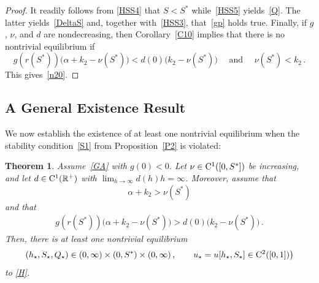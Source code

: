 \documentclass[reqno,11pt]{amsart}
\newtheorem{thm}{Theorem}[section]
\numberwithin{equation}{section}
\newcommand{\R}{\mathbb{R}}
\begin{document}
\begin{proof}
It readily follows from \eqref{HSS4} that $S<S^*$ while~\eqref{HSS5} yields~\eqref{Q}. The latter yields~\eqref{DeltaS}  and, together with~\eqref{HSS3}, that~\eqref{gp} holds true. Finally, if $g$, $\nu$, and $d$ are nondecreasing, then Corollary~\ref{C10} implies that there is no nontrivial equilibrium if 
$$
g(r(S^*))\big(\alpha+k_2-\nu(S^*)\big)< d(0)\big(k_2 -\nu(S^*)\big) \quad \text{ and }\quad \nu(S^*)< k_2\,.
$$
This gives~\eqref{n20}.
\end{proof}

\subsection{A General Existence Result}

We now establish the existence of at least one nontrivial equilibrium when the stability condition~\eqref{S1} from Proposition~\ref{P2} is violated:

\begin{thm}\label{P5}
Assume~\eqref{GA} with  $g(0)<0$. Let $\nu\in {\rm C}^1([0,S^*])$ be increasing, and let $d\in {\rm C}^1(\R^+)$ with $\lim_{h\to\infty} d(h)h=\infty$. Moreover, assume that
\begin{equation}\label{n1}
\alpha+k_2> \nu(S^*)
\end{equation}
and that
\begin{align}\label{n2}
g(r(S^*))\big(\alpha+k_2-\nu(S^*)\big)> d(0)\big(k_2 -\nu(S^*)\big)\,.
\end{align}
Then, there is at least one nontrivial equilibrium 
$$
(h_\star,S_\star,Q_\star)\in (0,\infty)\times (0,S^*)\times (0,\infty)\,,\qquad  u_\star=u[h_\star,S_\star]\in {\rm C}^2([0,1])\big)
$$ 
to \eqref{H}. 
\end{thm}
\end{document}

